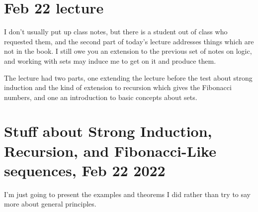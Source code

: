 \documentclass[12pt]{article}
\begin{document}
\section{Feb 22 lecture}

I don't usually put up class notes, but there is a student out of class who requested them, and the second part of today's lecture addresses things which are not in the book.  I still owe you an extension to the previous set of notes on logic, and working with sets may induce me to get on it and produce them.

The lecture had two parts, one extending the lecture before the test about strong induction and the kind of extension to recursion which gives the Fibonacci numbers, and one an introduction to basic concepts about sets.

\section{Stuff about Strong Induction, Recursion, and Fibonacci-Like sequences, Feb 22 2022}

I'm just going to present the examples and theorems I did rather than try to say more about general principles.
\end{document}
